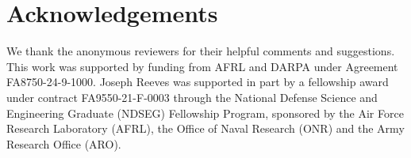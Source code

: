 \section{Acknowledgements}

We thank the anonymous reviewers for their helpful comments and
suggestions. This work was supported by funding from AFRL and DARPA under Agreement FA8750-24-9-1000. Joseph Reeves was supported in part by a fellowship award under contract FA9550-21-F-0003 through the National Defense Science and
Engineering Graduate (NDSEG) Fellowship Program, sponsored by the Air Force
Research Laboratory (AFRL), the Office of Naval Research (ONR) and the Army
Research Office (ARO).